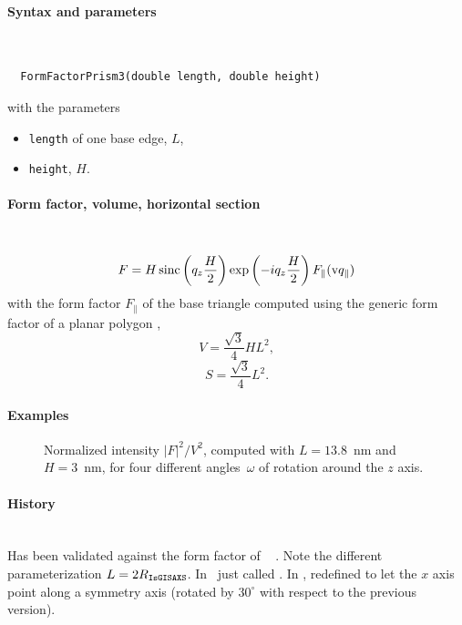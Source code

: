 \FloatBarrier

\paragraph{Syntax and parameters}\strut\\[-2ex plus .2ex minus .2ex]
\begin{lstlisting}
  FormFactorPrism3(double length, double height)
\end{lstlisting}
with the parameters
\begin{itemize}
\item \texttt{length} of one base edge, $L$,
\item \texttt{height}, $H$.
\end{itemize}

\paragraph{Form factor, volume, horizontal section}\strut\\
\begin{equation*}
F = H \operatorname{sinc}\left(q_z\frac{H}{2}\right) \exp\left(-i q_z\frac{ H}{2}\right) F_\parallel(\text{v}{q}_\parallel)
\end{equation*}
with the form factor $F_\parallel$ of the base triangle
computed using the generic form factor of a planar polygon \cite{Wut17},
\begin{equation*}
  V= \dfrac{\sqrt{3}}{4} H L^2,
\end{equation*}
\begin{equation*}
  S =\dfrac{\sqrt{3}}{4}L^2.
\end{equation*}

\paragraph{Examples}\strut

\begin{figure}[H]
\begin{center}
\end{center}
\caption{Normalized intensity $|F|^2/V^2$,
computed with $L=13.8$~nm and $H=3$~nm,
for four different angles~$\omega$ of rotation around the $z$ axis.}
\label{fig:FFprism3Ex}
\end{figure}

\paragraph{History}\strut\\
Has been validated against the  form factor of \IsGISAXS\
\cite[Eq.~2.29]{Laz06} \cite[Eq.~219]{ReLL09}.
Note the different parameterization $L= 2 R_{\rm{\texttt{IsGISAXS}}}$.
In \FitGISAXS\ just called \E{Prism} \cite{Bab13}.
In ,
redefined to let the $x$ axis point along a symmetry axis
(rotated by $30^\circ$ with respect to the previous version).

